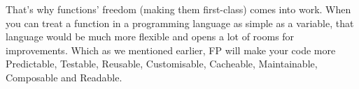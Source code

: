 That’s why functions’ freedom (making them first-class) comes into work. 
When you can treat a function in a programming language as simple as a variable, that language would be much more flexible and opens a lot of rooms for improvements. 
Which as we mentioned earlier, FP will make your code more Predictable, Testable, Reusable, Customisable, Cacheable, Maintainable, Composable and Readable.
 
 
 
 
 
 
 
 
 
% 
% 
